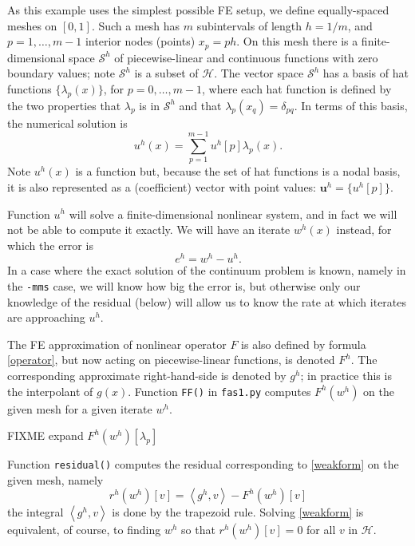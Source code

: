 \documentclass[letterpaper,final,12pt,reqno]{amsart}
\newcommand{\bu}{\mathbf{u}}
\newcommand{\ip}[2]{\left<#1,#2\right>}
\begin{document}
As this example uses the simplest possible FE setup, we define equally-spaced meshes on $[0,1]$.  Such a mesh has $m$ subintervals of length $h=1/m$, and $p=1,\dots,m-1$ interior nodes (points) $x_p=ph$.  On this mesh there is a finite-dimensional space $\mathcal{S}^h$ of piecewise-linear and continuous functions with zero boundary values; note $\mathcal{S}^h$ is a subset of $\mathcal{H}$.  The vector space $\mathcal{S}^h$ has a basis of hat functions $\{\lambda_p(x)\}$, for $p=0,\dots,m-1$, where each hat function is defined by the two properties that $\lambda_p$ is in $\mathcal{S}^h$ and that $\lambda_p(x_q)=\delta_{pq}$.  In terms of this basis, the numerical solution is
\begin{equation}
  u^h(x) = \sum_{p=1}^{m-1} u^h[p] \lambda_p(x).  \label{fesolution}
\end{equation}
Note $u^h(x)$ is a function but, because the set of hat functions is a nodal basis, it is also represented as a (coefficient) vector with point values: $\bu^h =\{u^h[p]\}$.

Function $u^h$ will solve a finite-dimensional nonlinear system, and in fact we will not be able to compute it exactly.  We will have an iterate $w^h(x)$ instead, for which the error is
\begin{equation}
  e^h = w^h - u^h.  \label{error}
\end{equation}
In a case where the exact solution of the continuum problem is known, namely in the \texttt{-mms} case, we will know how big the error is, but otherwise only our knowledge of the residual (below) will allow us to know the rate at which iterates are approaching $u^h$.

The FE approximation of nonlinear operator $F$ is also defined by formula \eqref{operator}, but now acting on piecewise-linear functions, is denoted $F^h$.  The corresponding approximate right-hand-side is denoted by $g^h$; in practice this is the interpolant of $g(x)$.  Function \texttt{FF()} in \texttt{fas1.py} computes $F^h(w^h)$ on the given mesh for a given iterate $w^h$.

FIXME expand $F^h(w^h)[\lambda_p]$

Function \texttt{residual()} computes the residual corresponding to \eqref{weakform} on the given mesh, namely
\begin{equation}
  r^h(w^h)[v] = \ip{g^h}{v} - F^h(w^h)[v]  \label{residual}
\end{equation}
the integral $\ip{g^h}{v}$ is done by the trapezoid rule.  Solving \eqref{weakform} is equivalent, of course, to finding $w^h$ so that $r^h(w^h)[v]=0$ for all $v$ in $\mathcal{H}$.
\end{document}
